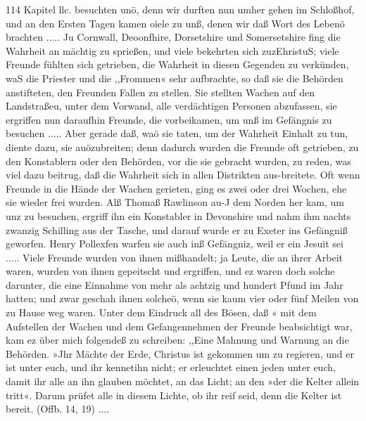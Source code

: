 114 Kapitel llc.
besuchten unö, denn wir durften nun umher gehen im Schloßhof,
und an den Ersten Tagen kamen oiele zu unß, denen wir daß
Wort des Lebenö brachten .....
Ju Cornwall, Deoonfhire, Dorsetshire und Somersetshire
fing die Wahrheit an mächtig zu sprießen, und viele bekehrten sich
zuzEhristuS; viele Freunde fühlten sich getrieben, die Wahrheit
in diesen Gegenden zu verkünden, waS die Priester und die
,,Frommen« sehr aufbrachte, so daß sie die Behörden anstifteten,
den Freunden Fallen zu stellen. Sie stellten Wachen auf den
Landstraßeu, unter dem Vorwand, alle verdächtigen Personen
abzufassen, sie ergriffen nun daraufhin Freunde, die vorbeikamen,
um unß im Gefängnis zu besuchen ..... Aber gerade daß,
waö sie taten, um der Wahrheit Einhalt zu tun, diente dazu, sie
auözubreiten; denn dadurch wurden die Freunde oft getrieben, zu
den Konstablern oder den Behörden, vor die sie gebracht wurden,
zu reden, was viel dazu beitrug, daß die Wahrheit sich in allen
Distrikten aus-breitete. Oft wenn Freunde in die Hände der
Wachen gerieten, ging es zwei oder drei Wochen, ehe sie wieder
frei wurden.
Alß Thomaß Rawlinson au-J dem Norden her kam, um unz
zu besuchen, ergriff ihn ein Konstabler in Devonshire und nahm
ihm nachts zwanzig Schilling aus der Tasche, und darauf wurde
er zu Exeter ins Gefängniß geworfen. Henry Pollexfen warfen
sie auch inß Gefängniz, weil er ein Jesuit sei ..... Viele
Freunde wurden von ihnen mißhandelt; ja Leute, die an ihrer
Arbeit waren, wurden von ihnen gepeitscht und ergriffen, und
ez waren doch solche darunter, die eine Einnahme von mehr
als achtzig und hundert Pfund im Jahr hatten; und zwar
geschah ihnen solcheö, wenn sie kaum vier oder fünf Meilen von
zu Hause weg waren. Unter dem Eindruck all des Bösen, daß «
mit dem Aufstellen der Wachen und dem Gefangennehmen der
Freunde beabsichtigt war, kam ez über mich folgendeß zu schreiben:
,,Eine Mahnung und Warnung an die Behörden.
»Jhr Mächte der Erde, Christus ist gekommen um zu regieren,
und er ist unter euch, und ihr kennetihn nicht; er erleuchtet einen
jeden unter euch, damit ihr alle an ihn glauben möchtet, an
das Licht; an den »der die Kelter allein tritt«. Darum prüfet
alle in diesem Lichte, ob ihr reif seid, denn die Kelter ist bereit.
(Offb. 14, 19) ....


